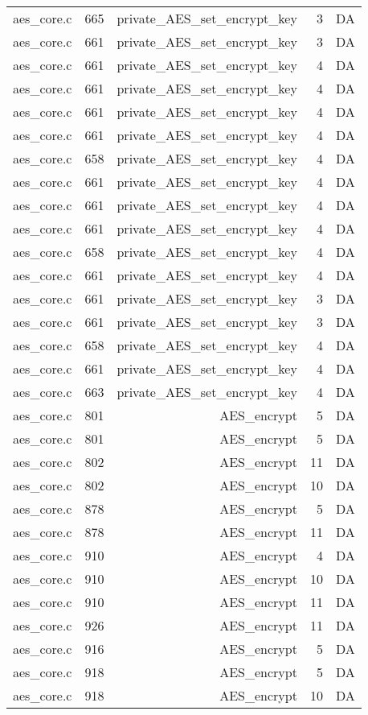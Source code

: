 \begin{table}[h]
{\begin{tabular}{clrrr}
aes\_core.c&665&private\_AES\_set\_encrypt\_key&3 &DA\\
aes\_core.c&661&private\_AES\_set\_encrypt\_key&3 &DA\\
aes\_core.c&661&private\_AES\_set\_encrypt\_key&4 &DA\\
aes\_core.c&661&private\_AES\_set\_encrypt\_key&4 &DA\\
aes\_core.c&661&private\_AES\_set\_encrypt\_key&4 &DA\\
aes\_core.c&661&private\_AES\_set\_encrypt\_key&4 &DA\\
aes\_core.c&658&private\_AES\_set\_encrypt\_key&4 &DA\\
aes\_core.c&661&private\_AES\_set\_encrypt\_key&4 &DA\\
aes\_core.c&661&private\_AES\_set\_encrypt\_key&4 &DA\\
aes\_core.c&661&private\_AES\_set\_encrypt\_key&4 &DA\\
aes\_core.c&658&private\_AES\_set\_encrypt\_key&4 &DA\\
aes\_core.c&661&private\_AES\_set\_encrypt\_key&4 &DA\\
aes\_core.c&661&private\_AES\_set\_encrypt\_key&3 &DA\\
aes\_core.c&661&private\_AES\_set\_encrypt\_key&3 &DA\\
aes\_core.c&658&private\_AES\_set\_encrypt\_key&4 &DA\\
aes\_core.c&661&private\_AES\_set\_encrypt\_key&4 &DA\\
aes\_core.c&663&private\_AES\_set\_encrypt\_key&4 &DA\\
aes\_core.c&801&AES\_encrypt&5 &DA\\
aes\_core.c&801&AES\_encrypt&5 &DA\\
aes\_core.c&802&AES\_encrypt&11&DA\\
aes\_core.c&802&AES\_encrypt&10&DA\\
aes\_core.c&878&AES\_encrypt&5 &DA\\
aes\_core.c&878&AES\_encrypt&11&DA\\
aes\_core.c&910&AES\_encrypt&4 &DA\\
aes\_core.c&910&AES\_encrypt&10&DA\\
aes\_core.c&910&AES\_encrypt&11&DA\\
aes\_core.c&926&AES\_encrypt&11&DA\\
aes\_core.c&916&AES\_encrypt&5 &DA\\
aes\_core.c&918&AES\_encrypt&5 &DA\\
aes\_core.c&918&AES\_encrypt&10&DA\\

\end{tabular}}
\end{table}
